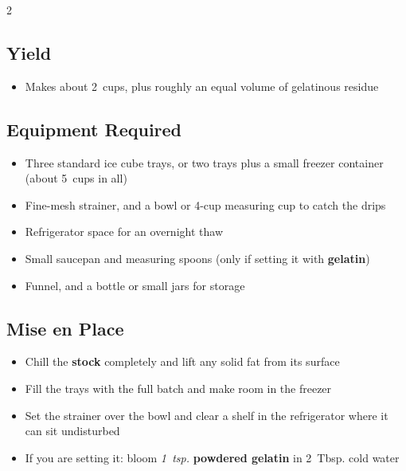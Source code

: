 \documentclass[11pt,letterpaper]{article}
\begin{document}
{\scriptsize
\setlength{\columnsep}{20pt}
\setlength{\multicolsep}{6pt}
\begin{multicols}{2}
\setlength{\parindent}{0pt}
\setlength{\parskip}{2pt}
\setlength{\itemsep}{0pt}
\setlength{\parsep}{0pt}

\subsection*{Yield}
\begin{itemize}
    \item Makes about 2~cups, plus roughly an equal volume of gelatinous residue
\end{itemize}

\subsection*{Equipment Required}
\begin{itemize}
    \item Three standard ice cube trays, or two trays plus a small freezer container (about 5~cups in all)
    \item Fine-mesh strainer, and a bowl or 4-cup measuring cup to catch the drips
    \item Refrigerator space for an overnight thaw
    \item Small saucepan and measuring spoons (only if setting it with \textbf{gelatin})
    \item Funnel, and a bottle or small jars for storage
\end{itemize}

\subsection*{Mise en Place}
\begin{itemize}
    \item Chill the \textbf{stock} completely and lift any solid fat from its surface
    \item Fill the trays with the full batch and make room in the freezer
    \item Set the strainer over the bowl and clear a shelf in the refrigerator where it can sit undisturbed
    \item If you are setting it: bloom \textit{1~tsp.} \textbf{powdered gelatin} in 2~Tbsp. cold water
\end{itemize}


\end{multicols}}
\end{document}
